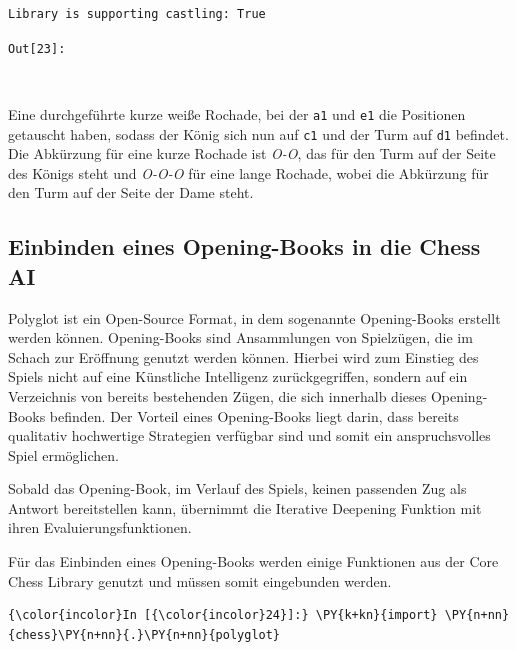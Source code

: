     \begin{Verbatim}[commandchars=\\\{\}]
Library is supporting castling: True

    \end{Verbatim}
\texttt{\color{outcolor}Out[{\color{outcolor}23}]:}
    
    \begin{center}
    \end{center}
    { \hspace*{\fill} \\}
    

    Eine durchgeführte kurze weiße Rochade, bei der \texttt{a1} und
\texttt{e1} die Positionen getauscht haben, sodass der König sich nun
auf \texttt{c1} und der Turm auf \texttt{d1} befindet. Die Abkürzung für
eine kurze Rochade ist \emph{O-O}, das für den Turm auf der Seite des
Königs steht und \emph{O-O-O} für eine lange Rochade, wobei die
Abkürzung für den Turm auf der Seite der Dame steht.

    \subsection{Einbinden eines Opening-Books in die Chess
AI}\label{einbinden-eines-opening-books-in-die-chess-ai}

Polyglot ist ein Open-Source Format, in dem sogenannte Opening-Books
erstellt werden können. Opening-Books sind Ansammlungen von Spielzügen,
die im Schach zur Eröffnung genutzt werden können. Hierbei wird zum
Einstieg des Spiels nicht auf eine Künstliche Intelligenz
zurückgegriffen, sondern auf ein Verzeichnis von bereits bestehenden
Zügen, die sich innerhalb dieses Opening-Books befinden. Der Vorteil
eines Opening-Books liegt darin, dass bereits qualitativ hochwertige
Strategien verfügbar sind und somit ein anspruchsvolles Spiel
ermöglichen.

Sobald das Opening-Book, im Verlauf des Spiels, keinen passenden Zug als
Antwort bereitstellen kann, übernimmt die Iterative Deepening Funktion mit ihren Evaluierungsfunktionen.

Für das Einbinden eines Opening-Books werden einige Funktionen aus der
Core Chess Library genutzt und müssen somit eingebunden werden.

    \begin{Verbatim}[commandchars=\\\{\}]
{\color{incolor}In [{\color{incolor}24}]:} \PY{k+kn}{import} \PY{n+nn}{chess}\PY{n+nn}{.}\PY{n+nn}{polyglot}
\end{Verbatim}


